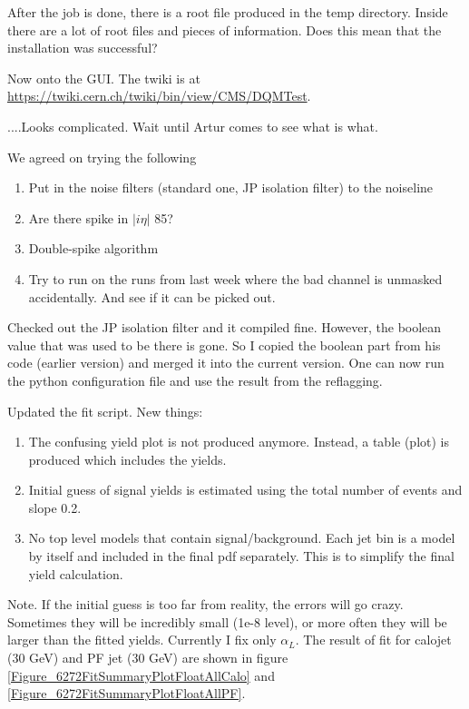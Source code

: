 After the job is done, there is a root file produced in the temp directory.  Inside there are a lot of root files
and pieces of information.  Does this mean that the installation was successful?

Now onto the GUI.  The twiki is at \url{https://twiki.cern.ch/twiki/bin/view/CMS/DQMTest}.

....Looks complicated.  Wait until Artur comes to see what is what.


We agreed on trying the following

\begin{enumerate}
\item Put in the noise filters (standard one, JP isolation filter) to the noiseline
\item Are there spike in $|i\eta|$ 85?
\item Double-spike algorithm
\item Try to run on the runs from last week where the bad channel is unmasked accidentally.  And see if it can be picked out.
\end{enumerate}


Checked out the JP isolation filter and it compiled fine.  However, the boolean value that was used to be there is gone.
So I copied the boolean part from his code (earlier version) and merged it into the current version.  One can now run
the python configuration file and use the result from the reflagging.


Updated the fit script.  New things:

\begin{enumerate}
\item The confusing yield plot is not produced anymore.  Instead, a table (plot) is produced which includes the yields.
\item Initial guess of signal yields is estimated using the total number of events and slope 0.2.
\item No top level models that contain signal/background.  Each jet bin is a model by itself and included in the final pdf separately.  This is to simplify the final yield calculation.
\end{enumerate}

Note.  If the initial guess is too far from reality, the errors will go crazy.  Sometimes they will be incredibly small (1e-8 level), or more often they will be larger than the fitted yields.
Currently I fix only $\alpha_L$.  The result of fit for calojet (30 GeV) and PF jet (30 GeV) are shown in figure \ref{Figure_6272FitSummaryPlotFloatAllCalo} and \ref{Figure_6272FitSummaryPlotFloatAllPF}.

